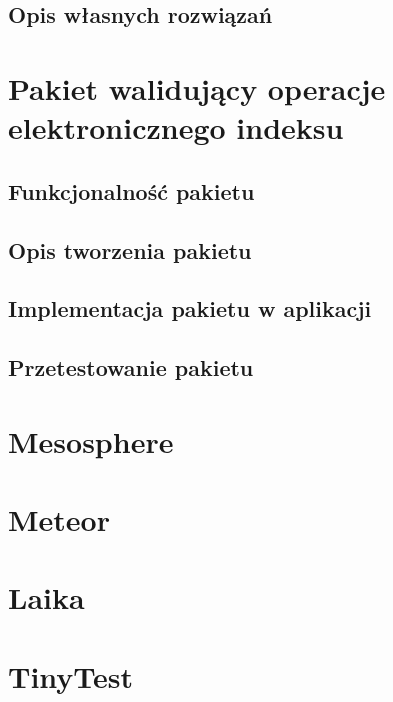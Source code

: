 \documentclass[brudnopis]{xmgr}
\begin{document}
\section{Opis własnych rozwiązań}


\chapter{Pakiet walidujący operacje elektronicznego indeksu}

\section{Funkcjonalność pakietu}
\section{Opis tworzenia pakietu}
\cite{Packages}
\cite{MeteorDocs}
\cite{DiscoverMeteor2013}
\section{Implementacja pakietu w aplikacji}
\section{Przetestowanie pakietu}
\cite{TinyTest}

\summary

\appendix
\chapter{Mesosphere}


\chapter{Meteor}


\chapter{Laika}


\chapter{TinyTest}







\listoftables

\listoffigures

\oswiadczenie
\end{document}
